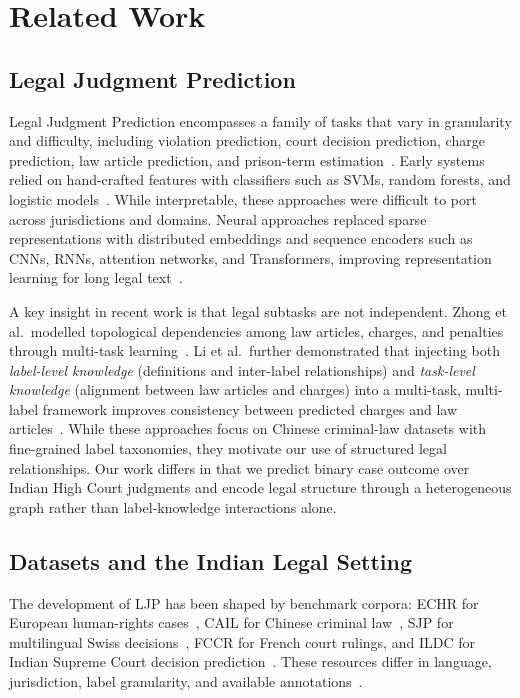 \documentclass[runningheads]{llncs}
\begin{document}
\section{Related Work}
\label{sec:related-work}

\subsection{Legal Judgment Prediction}
\label{subsec:ljp}

Legal Judgment Prediction encompasses a family of tasks that vary in granularity and difficulty, including violation prediction, court decision prediction, charge prediction, law article prediction, and prison-term estimation~\cite{feng2022survey}. Early systems relied on hand-crafted features with classifiers such as SVMs, random forests, and logistic models~\cite{aletras2016predicting,katz2017general}. While interpretable, these approaches were difficult to port across jurisdictions and domains. Neural approaches replaced sparse representations with distributed embeddings and sequence encoders such as CNNs, RNNs, attention networks, and Transformers, improving representation learning for long legal text~\cite{luo2017learning,zhong2018legal,chalkidis2019neural}.

A key insight in recent work is that legal subtasks are not independent. Zhong et al.\ modelled topological dependencies among law articles, charges, and penalties through multi-task learning~\cite{zhong2018legal}. Li et al.\ further demonstrated that injecting both \emph{label-level knowledge} (definitions and inter-label relationships) and \emph{task-level knowledge} (alignment between law articles and charges) into a multi-task, multi-label framework improves consistency between predicted charges and law articles~\cite{li2025kljp}. While these approaches focus on Chinese criminal-law datasets with fine-grained label taxonomies, they motivate our use of structured legal relationships. Our work differs in that we predict binary case outcome over Indian High Court judgments and encode legal structure through a heterogeneous graph rather than label-knowledge interactions alone.

\subsection{Datasets and the Indian Legal Setting}
\label{subsec:datasets}

The development of LJP has been shaped by benchmark corpora: ECHR for European human-rights cases~\cite{chalkidis2019neural}, CAIL for Chinese criminal law~\cite{xiao2018cail}, SJP for multilingual Swiss decisions~\cite{niklaus2021swiss}, FCCR for French court rulings, and ILDC for Indian Supreme Court decision prediction~\cite{malik2021ildc}. These resources differ in language, jurisdiction, label granularity, and available annotations~\cite{feng2022survey}.
\end{document}
